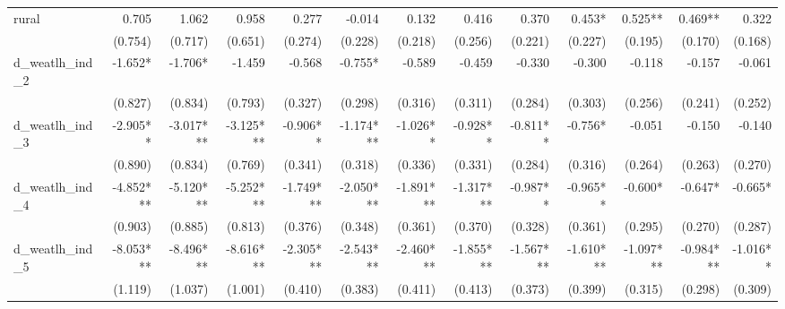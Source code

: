 \begin{tabular}{lrrrrrrrrrrrr}
rural                                       &        0.705 &        1.062 &        0.958 &        0.277 &       -0.014 &        0.132 &        0.416 &        0.370 &       0.453* &      0.525** &      0.469** &        0.322 \\ 
                                            &      (0.754) &      (0.717) &      (0.651) &      (0.274) &      (0.228) &      (0.218) &      (0.256) &      (0.221) &      (0.227) &      (0.195) &      (0.170) &      (0.168) \\ 
d\_weatlh\_ind\_2                           &      -1.652* &      -1.706* &       -1.459 &       -0.568 &      -0.755* &       -0.589 &       -0.459 &       -0.330 &       -0.300 &       -0.118 &       -0.157 &       -0.061 \\ 
                                            &      (0.827) &      (0.834) &      (0.793) &      (0.327) &      (0.298) &      (0.316) &      (0.311) &      (0.284) &      (0.303) &      (0.256) &      (0.241) &      (0.252) \\ 
d\_weatlh\_ind\_3                           &     -2.905** &    -3.017*** &    -3.125*** &     -0.906** &    -1.174*** &     -1.026** &     -0.928** &     -0.811** &      -0.756* &       -0.051 &       -0.150 &       -0.140 \\ 
                                            &      (0.890) &      (0.834) &      (0.769) &      (0.341) &      (0.318) &      (0.336) &      (0.331) &      (0.284) &      (0.316) &      (0.264) &      (0.263) &      (0.270) \\ 
d\_weatlh\_ind\_4                           &    -4.852*** &    -5.120*** &    -5.252*** &    -1.749*** &    -2.050*** &    -1.891*** &    -1.317*** &     -0.987** &     -0.965** &      -0.600* &      -0.647* &      -0.665* \\ 
                                            &      (0.903) &      (0.885) &      (0.813) &      (0.376) &      (0.348) &      (0.361) &      (0.370) &      (0.328) &      (0.361) &      (0.295) &      (0.270) &      (0.287) \\ 
d\_weatlh\_ind\_5                           &    -8.053*** &    -8.496*** &    -8.616*** &    -2.305*** &    -2.543*** &    -2.460*** &    -1.855*** &    -1.567*** &    -1.610*** &    -1.097*** &    -0.984*** &     -1.016** \\ 
                                            &      (1.119) &      (1.037) &      (1.001) &      (0.410) &      (0.383) &      (0.411) &      (0.413) &      (0.373) &      (0.399) &      (0.315) &      (0.298) &      (0.309) \\ 

\end{tabular}
